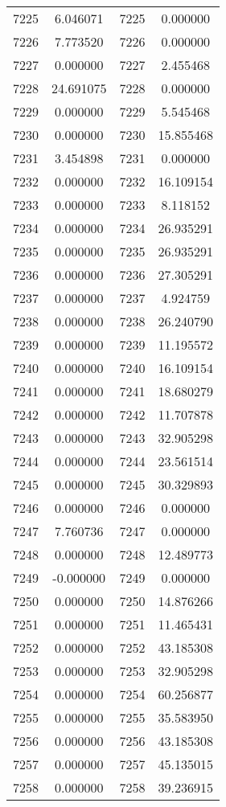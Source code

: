 \documentclass[12pt]{article}
\begin{document}
\begin{longtable}{@{}cccc@{}}
7225 & 6.046071 & 7225 & 0.000000 \\
7226 & 7.773520 & 7226 & 0.000000 \\
7227 & 0.000000 & 7227 & 2.455468 \\
7228 & 24.691075 & 7228 & 0.000000 \\
7229 & 0.000000 & 7229 & 5.545468 \\
7230 & 0.000000 & 7230 & 15.855468 \\
7231 & 3.454898 & 7231 & 0.000000 \\
7232 & 0.000000 & 7232 & 16.109154 \\
7233 & 0.000000 & 7233 & 8.118152 \\
7234 & 0.000000 & 7234 & 26.935291 \\
7235 & 0.000000 & 7235 & 26.935291 \\
7236 & 0.000000 & 7236 & 27.305291 \\
7237 & 0.000000 & 7237 & 4.924759 \\
7238 & 0.000000 & 7238 & 26.240790 \\
7239 & 0.000000 & 7239 & 11.195572 \\
7240 & 0.000000 & 7240 & 16.109154 \\
7241 & 0.000000 & 7241 & 18.680279 \\
7242 & 0.000000 & 7242 & 11.707878 \\
7243 & 0.000000 & 7243 & 32.905298 \\
7244 & 0.000000 & 7244 & 23.561514 \\
7245 & 0.000000 & 7245 & 30.329893 \\
7246 & 0.000000 & 7246 & 0.000000 \\
7247 & 7.760736 & 7247 & 0.000000 \\
7248 & 0.000000 & 7248 & 12.489773 \\
7249 & -0.000000 & 7249 & 0.000000 \\
7250 & 0.000000 & 7250 & 14.876266 \\
7251 & 0.000000 & 7251 & 11.465431 \\
7252 & 0.000000 & 7252 & 43.185308 \\
7253 & 0.000000 & 7253 & 32.905298 \\
7254 & 0.000000 & 7254 & 60.256877 \\
7255 & 0.000000 & 7255 & 35.583950 \\
7256 & 0.000000 & 7256 & 43.185308 \\
7257 & 0.000000 & 7257 & 45.135015 \\
7258 & 0.000000 & 7258 & 39.236915 \\

\end{longtable}
\end{document}
